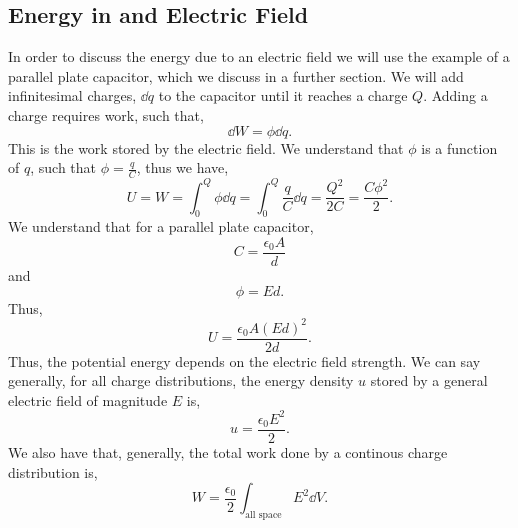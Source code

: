 \documentclass{book}
\begin{document}
\subsection{Energy in and Electric Field}
In order to discuss the energy due to an electric field we will use the example of a parallel plate capacitor, which we discuss in a further section. We will add infinitesimal charges, $\dd{q}$ to the capacitor until it reaches a charge $Q$. Adding a charge requires work, such that,
\begin{equation}
    \dd{W} = \phi \dd{q}.
\end{equation}
This is the work stored by the electric field. We understand that $\phi$ is a function of $q$, such that $\phi = \frac{q}{C}$, thus we have,
\begin{equation}
    U = W = \int_0^Q \phi \dd{q} = \int_0^Q\frac{q}{C}\dd{q} = \frac{Q^2}{2C} = \frac{C\phi^2}{2}.
\end{equation}
We understand that for a parallel plate capacitor, 
\begin{equation}
    C = \frac{\epsilon_0A}{d}
\end{equation}
and
\begin{equation}
    \phi = Ed.
\end{equation}
Thus,
\begin{equation}
    U = \frac{\epsilon_0A(Ed)^2}{2d}.
\end{equation}
Thus, the potential energy depends on the electric field strength. We can say generally, for all charge distributions, the energy density $u$ stored by a general electric field of magnitude $E$ is,
\begin{equation}
    u = \frac{\epsilon_0E^2}{2}.
\end{equation}
We also have that, generally, the total work done by a continous charge distribution is,
\begin{equation}
    W = \frac{\epsilon_0}{2}\int_{\text{all space}} E^2 \dd{V}.
\end{equation}
\end{document}
